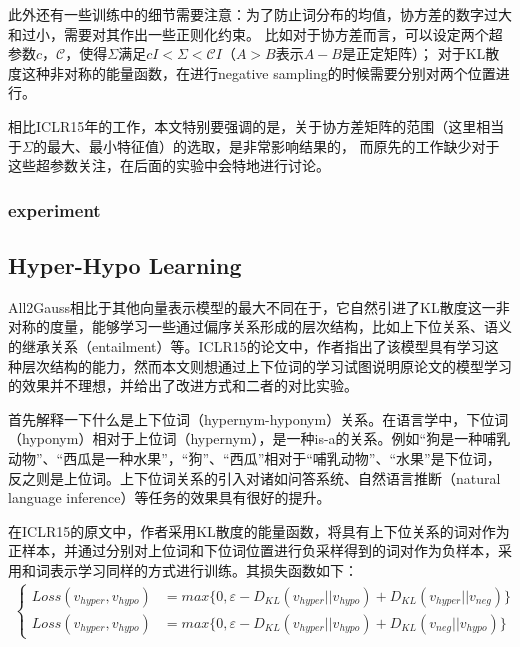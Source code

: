 \documentclass[13pt]{article}
\begin{document}
此外还有一些训练中的细节需要注意：为了防止词分布的均值，协方差的数字过大和过小，需要对其作出一些正则化约束。
比如对于协方差而言，可以设定两个超参数$c$，$\mathcal{C}$，使得$\Sigma$满足$cI<\Sigma<\mathcal{C} I$（$A>B$表示$A-B$是正定矩阵）；
对于KL散度这种非对称的能量函数，在进行negative sampling的时候需要分别对两个位置进行。

相比ICLR15年的工作，本文特别要强调的是，关于协方差矩阵的范围（这里相当于$\Sigma$的最大、最小特征值）的选取，是非常影响结果的，
而原先的工作缺少对于这些超参数关注，在后面的实验中会特地进行讨论。
\subsubsection{experiment}
\subsection{Hyper-Hypo Learning}
All2Gauss相比于其他向量表示模型的最大不同在于，它自然引进了KL散度这一非对称的度量，能够学习一些通过偏序关系形成的层次结构，比如上下位关系、语义的继承关系（entailment）等。ICLR15的论文中，作者指出了该模型具有学习这种层次结构的能力，然而本文则想通过上下位词的学习试图说明原论文的模型学习的效果并不理想，并给出了改进方式和二者的对比实验。

首先解释一下什么是上下位词（hypernym-hyponym）关系。在语言学中，下位词（hyponym）相对于上位词（hypernym），是一种is-a的关系。例如“狗是一种哺乳动物”、“西瓜是一种水果”，“狗”、“西瓜”相对于“哺乳动物”、“水果”是下位词，反之则是上位词。上下位词关系的引入对诸如问答系统、自然语言推断（natural language inference）等任务的效果具有很好的提升。

在ICLR15的原文中，作者采用KL散度的能量函数，将具有上下位关系的词对作为正样本，并通过分别对上位词和下位词位置进行负采样得到的词对作为负样本，采用和词表示学习同样的方式进行训练。其损失函数如下：
\begin{align*}
\begin{cases}
Loss(v_{hyper}, v_{hypo}) &= max\{ 0, \varepsilon - D_{KL}(v_{hyper}||v_{hypo}) + D_{KL}(v_{hyper}||v_{neg}) \}  \\
Loss(v_{hyper}, v_{hypo}) &= max\{ 0, \varepsilon - D_{KL}(v_{hyper}||v_{hypo}) + D_{KL}(v_{neg}||v_{hypo}) \}
\end{cases}
\end{align*}
\end{document}
